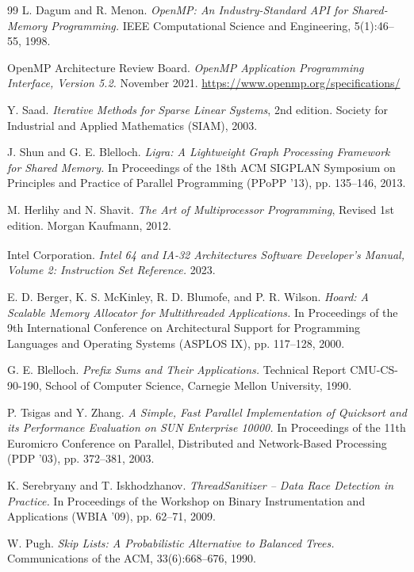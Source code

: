 \documentclass[12pt,a4paper,openany,oneside]{report}
\theoremstyle{plain}
\numberwithin{equation}{section}
\begin{document}
\begin{thebibliography}{99}
L. Dagum and R. Menon.
\textit{OpenMP: An Industry-Standard API for Shared-Memory Programming.}
IEEE Computational Science and Engineering, 5(1):46--55, 1998.

OpenMP Architecture Review Board.
\textit{OpenMP Application Programming Interface, Version 5.2.}
November 2021. \url{https://www.openmp.org/specifications/}

Y. Saad.
\textit{Iterative Methods for Sparse Linear Systems}, 2nd edition.
Society for Industrial and Applied Mathematics (SIAM), 2003.

J. Shun and G. E. Blelloch.
\textit{Ligra: A Lightweight Graph Processing Framework for Shared Memory.}
In Proceedings of the 18th ACM SIGPLAN Symposium on Principles and Practice of Parallel Programming (PPoPP '13), pp. 135--146, 2013.

M. Herlihy and N. Shavit.
\textit{The Art of Multiprocessor Programming}, Revised 1st edition.
Morgan Kaufmann, 2012.

Intel Corporation.
\textit{Intel\textsuperscript{\textregistered} 64 and IA-32 Architectures Software Developer's Manual, Volume 2: Instruction Set Reference.}
2023.

E. D. Berger, K. S. McKinley, R. D. Blumofe, and P. R. Wilson.
\textit{Hoard: A Scalable Memory Allocator for Multithreaded Applications.}
In Proceedings of the 9th International Conference on Architectural Support for Programming Languages and Operating Systems (ASPLOS IX), pp. 117--128, 2000.

G. E. Blelloch.
\textit{Prefix Sums and Their Applications.}
Technical Report CMU-CS-90-190, School of Computer Science, Carnegie Mellon University, 1990.

P. Tsigas and Y. Zhang.
\textit{A Simple, Fast Parallel Implementation of Quicksort and its Performance Evaluation on SUN Enterprise 10000.}
In Proceedings of the 11th Euromicro Conference on Parallel, Distributed and Network-Based Processing (PDP '03), pp. 372--381, 2003.

K. Serebryany and T. Iskhodzhanov.
\textit{ThreadSanitizer -- Data Race Detection in Practice.}
In Proceedings of the Workshop on Binary Instrumentation and Applications (WBIA '09), pp. 62--71, 2009.

W. Pugh.
\textit{Skip Lists: A Probabilistic Alternative to Balanced Trees.}
Communications of the ACM, 33(6):668--676, 1990.


\end{thebibliography}
\end{document}
